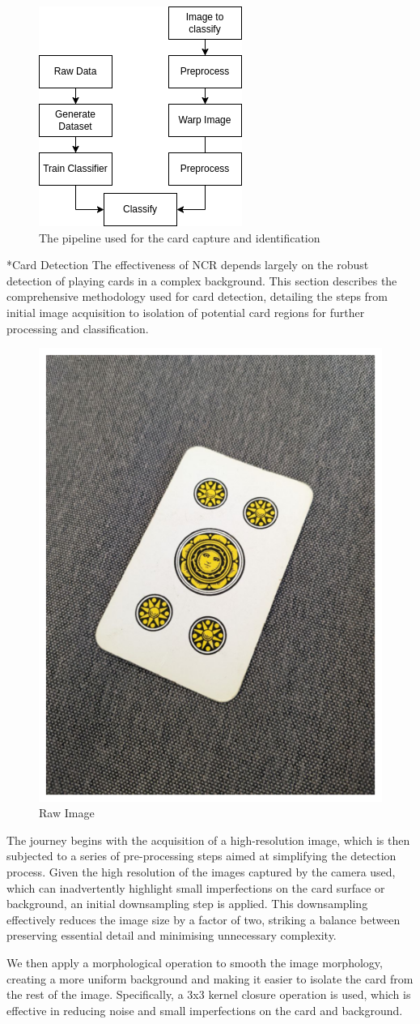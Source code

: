 \documentclass[twocolumn, a4paper,10pt]{article}
\makeatletter
\renewcommand\subsection{\@startsection{subsection}{1}{\z@}{\z@}{\z@}{\normalfont\normalsize\bfseries}}
\renewcommand\subsection{\@startsection{subsection}{1}{\z@}{\z@}{0.1pt}{\normalfont\normalsize\bfseries}}
\makeatother
\begin{document}
\begin{figure}[H]
  \centering
\includegraphics[width=.26\textwidth]{img/genralDescription.png}
\caption*{The pipeline used for the card capture and identification} 
\end{figure}


\subsection*{Card Detection}
The effectiveness of NCR depends largely on the robust detection of playing cards in a complex background. This section describes the comprehensive methodology used for card detection, detailing the steps from initial image acquisition to isolation of potential card regions for further processing and classification.

\begin{figure}[H]
  \centering
\includegraphics[width=.26\textwidth]{img/1-raw.png}
\caption*{Raw Image} 
\end{figure}

The journey begins with the acquisition of a high-resolution image, which is then subjected to a series of pre-processing steps aimed at simplifying the detection process. Given the high resolution of the images captured by the camera used, which can inadvertently highlight small imperfections on the card surface or background, an initial downsampling step is applied. This downsampling effectively reduces the image size by a factor of two, striking a balance between preserving essential detail and minimising unnecessary complexity.

We then apply a morphological operation to smooth the image morphology, creating a more uniform background and making it easier to isolate the card from the rest of the image. Specifically, a 3x3 kernel closure operation is used, which is effective in reducing noise and small imperfections on the card and background.
\end{document}
